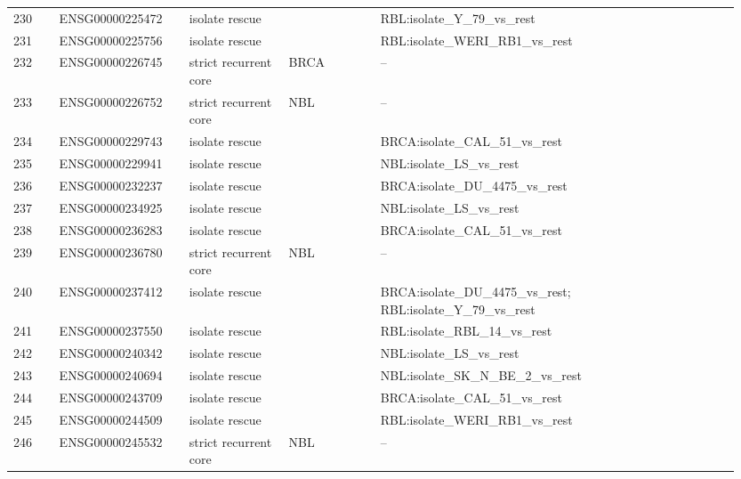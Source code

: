\begin{landscape}
{\begin{longtable}{p{0.06\linewidth}p{0.17\linewidth}p{0.13\linewidth}p{0.12\linewidth}p{0.47\linewidth}}
230 & ENSG00000225472 & isolate rescue &  & RBL:isolate\_\allowbreak{}Y\_\allowbreak{}79\_\allowbreak{}vs\_\allowbreak{}rest \\
231 & ENSG00000225756 & isolate rescue &  & RBL:isolate\_\allowbreak{}WERI\_\allowbreak{}RB1\_\allowbreak{}vs\_\allowbreak{}rest \\
232 & ENSG00000226745 & strict recurrent core & BRCA & -- \\
233 & ENSG00000226752 & strict recurrent core & NBL & -- \\
234 & ENSG00000229743 & isolate rescue &  & BRCA:isolate\_\allowbreak{}CAL\_\allowbreak{}51\_\allowbreak{}vs\_\allowbreak{}rest \\
235 & ENSG00000229941 & isolate rescue &  & NBL:isolate\_\allowbreak{}LS\_\allowbreak{}vs\_\allowbreak{}rest \\
236 & ENSG00000232237 & isolate rescue &  & BRCA:isolate\_\allowbreak{}DU\_\allowbreak{}4475\_\allowbreak{}vs\_\allowbreak{}rest \\
237 & ENSG00000234925 & isolate rescue &  & NBL:isolate\_\allowbreak{}LS\_\allowbreak{}vs\_\allowbreak{}rest \\
238 & ENSG00000236283 & isolate rescue &  & BRCA:isolate\_\allowbreak{}CAL\_\allowbreak{}51\_\allowbreak{}vs\_\allowbreak{}rest \\
239 & ENSG00000236780 & strict recurrent core & NBL & -- \\
240 & ENSG00000237412 & isolate rescue &  & BRCA:isolate\_\allowbreak{}DU\_\allowbreak{}4475\_\allowbreak{}vs\_\allowbreak{}rest; RBL:isolate\_\allowbreak{}Y\_\allowbreak{}79\_\allowbreak{}vs\_\allowbreak{}rest \\
241 & ENSG00000237550 & isolate rescue &  & RBL:isolate\_\allowbreak{}RBL\_\allowbreak{}14\_\allowbreak{}vs\_\allowbreak{}rest \\
242 & ENSG00000240342 & isolate rescue &  & NBL:isolate\_\allowbreak{}LS\_\allowbreak{}vs\_\allowbreak{}rest \\
243 & ENSG00000240694 & isolate rescue &  & NBL:isolate\_\allowbreak{}SK\_\allowbreak{}N\_\allowbreak{}BE\_\allowbreak{}2\_\allowbreak{}vs\_\allowbreak{}rest \\
244 & ENSG00000243709 & isolate rescue &  & BRCA:isolate\_\allowbreak{}CAL\_\allowbreak{}51\_\allowbreak{}vs\_\allowbreak{}rest \\
245 & ENSG00000244509 & isolate rescue &  & RBL:isolate\_\allowbreak{}WERI\_\allowbreak{}RB1\_\allowbreak{}vs\_\allowbreak{}rest \\
246 & ENSG00000245532 & strict recurrent core & NBL & -- \\

\end{longtable}}
\end{landscape}
